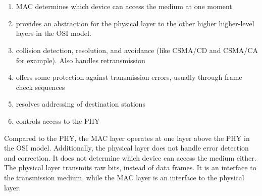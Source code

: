\section{}

\begin{enumerate}
  \item MAC determines which device can access the medium at one moment
  \item provides an abstraction for the physical layer to the other higher
    higher-level layers in the OSI model. 
  \item collision detection, resolution, and avoidance (like CSMA/CD and CSMA/CA
    for example). Also handles retransmission
  \item offers some protection against transmission errors, usually through
    frame check sequences
  \item resolves addressing of destination stations
  \item controls access to the PHY
\end{enumerate}

Compared to the PHY, the MAC layer operates at one layer above the PHY in the
OSI model. Additionally, the physical layer does not handle error detection and
correction. It does not determine which device can access the medium either. The
physical layer transmits raw bits, instead of data frames. It is an interface to
the transmission medium, while the MAC layer is an interface to the physical
layer.
